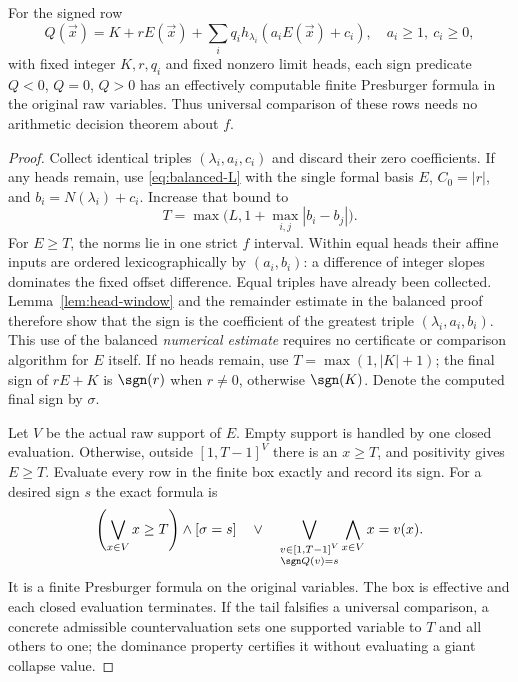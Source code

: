 \documentclass[11pt]{article}
\begin{document}
\begin{theorem}\label{thm:single-core}
For the signed row
\begin{equation}\label{eq:single-core}
 Q(\vec x)=K+rE(\vec x)+
       \sum_i q_i h_{\lambda_i}(a_iE(\vec x)+c_i),
 \quad a_i\ge1,\ c_i\ge0,
\end{equation}
with fixed integer $K,r,q_i$ and fixed nonzero limit heads, each sign
predicate $Q<0$, $Q=0$, $Q>0$ has an effectively computable finite
Presburger formula in the original raw variables. Thus universal comparison
of these rows needs no arithmetic decision theorem about $f$.
\end{theorem}
\begin{proof}
Collect identical triples $(\lambda_i,a_i,c_i)$ and discard their zero
coefficients. If any heads remain, use \eqref{eq:balanced-L} with the
single formal basis $E$, $C_0=|r|$, and $b_i=N(\lambda_i)+c_i$. Increase
that bound to
\[
 T=\max\bigl(L,1+\max_{i,j}|b_i-b_j|\bigr).
\]
For $E\ge T$, the norms lie in one strict $f$ interval. Within equal
heads their affine inputs are ordered lexicographically by $(a_i,b_i)$:
a difference of integer slopes dominates the fixed offset difference.
Equal triples have already been collected. Lemma~\ref{lem:head-window}
and the remainder estimate in the balanced proof therefore show that
the sign is the coefficient of the greatest triple
$(\lambda_i,a_i,b_i)$. This use of the balanced \emph{numerical estimate}
requires no certificate or comparison algorithm for $E$ itself.
If no heads remain, use $T=\max(1,|K|+1)$; the final sign of $rE+K$ is
$\sgn(r)$ when $r\ne0$, otherwise $\sgn(K)$. Denote the computed final
sign by $\sigma$.

Let $V$ be the actual raw support of $E$. Empty support is handled by one
closed evaluation. Otherwise, outside $[1,T-1]^V$ there is an $x\ge T$,
and positivity gives $E\ge T$. Evaluate every row in the finite box exactly
and record its sign. For a desired sign $s$ the exact formula is
\[
 \left(\bigvee_{x\in V}x\ge T\right)\wedge[\sigma=s]
 \quad\vee\quad
 \bigvee_{\substack{v\in[1,T-1]^V\\\sgn Q(v)=s}}
       \bigwedge_{x\in V}x=v(x).
\]
It is a finite Presburger formula on the original variables. The box is
effective and each closed evaluation terminates. If the tail falsifies a
universal comparison, a concrete admissible countervaluation sets one
supported variable to $T$ and all others to one; the dominance property
certifies it without evaluating a giant collapse value.
\end{proof}
\end{document}
